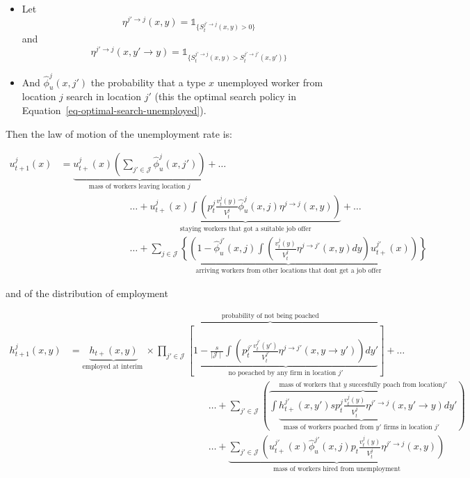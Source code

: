 \documentclass[
  letterpaper,
  DIV=11,
  numbers=noendperiod]{scrreprt}
\providecommand{\tightlist}{%
  \setlength{\itemsep}{0pt}\setlength{\parskip}{0pt}}\usepackage{longtable,booktabs,array}
\begin{document}
\begin{itemize}
\tightlist
\item
  Let
  \[\eta^{j' \to j}(x,y) = \mathbb{1}_{\{S_{t}^{j' \to j}(x,y)>0\}}\]
  and
  \[\eta^{j' \to j}(x,y'\to y) = \mathbb{1}_{\{S^{j' \to j}_{t}(x,y) > S^{j' \to j'}_{t}(x,y')\}}\]
\item
  And \(\hat{\phi}^j_u(x,j')\) the probability that a type \(x\)
  unemployed worker from location \(j\) search in location \(j'\) (this
  the optimal search policy in
  Equation~\ref{eq-optimal-search-unemployed}).
\end{itemize}

Then the law of motion of the unemployment rate is:

\begin{align}
u^{j}_{t+1}(x) &= \underbrace{u^j_{t+}(x)\left(\sum_{j'\in \mathcal{J}}\hat{\phi}^{j}_{u}(x,j')\right)}_{\text{mass of workers leaving location }j} +\ldots \nonumber \\
&\hspace{3cm} \ldots+ \underbrace{u_{t+}^j(x)\int\left(p^j_t\frac{v^j_t(y)}{V^j_t}\hat{\phi}_u^j(x,j)\eta^{j\to j}(x,y)\right)}_{\text{staying workers that got a suitable job offer}} +\ldots \nonumber \\
&\hspace{3cm} \ldots+ \underbrace{\sum_{j\in \mathcal{J}}\left\{\left(1 - \hat{\phi}^{j'}_{u}(x,j)\int\left(\frac{v^j_{t}(y)}{V^j_t}\eta^{j\to j'}(x,y)dy \right)u^{j'}_{t+}(x) \right) \right\}}_{\text{arriving workers from other locations that dont get a job offer}}
\end{align}

and of the distribution of employment

\begin{align}
h^{j}_{t+1}(x,y) &= \underbrace{h_{t+}(x,y)}_{\text{employed at interim }} \times \overbrace{\prod_{j'\in\mathcal{J}}\left[ \underbrace{1 - \frac{s}{\mid \mathcal{J} \mid}\int\left( p^{j'}_t\frac{v^{j'}_t(y')}{V^{j'}_t} \eta^{j\to j'}(x,y\to y')\right)dy'}_{\text{no poeached by any firm in location }j'} \right]}^{\text{probability of not being poached}}+\ldots\nonumber
\\
&\hspace{6cm} \ldots+\sum_{j'\in \mathcal{J}}\left(\overbrace{\int\underbrace{ h^{j'}_{t+}(x,y')sp^j_t\frac{v^{j}_t(y)}{V^{j}_t}\eta^{j'\to j}(x,y'\to y)}_{\text{mass of workers poached from } y' \text{ firms in location } j'}dy'}^{\text{mass of workers that } y \text{ succesfully poach from location} j'} \right) \nonumber \\
&\hspace{6cm}\ldots +  \underbrace{\sum_{j'\in \mathcal{J}}\left( u^{j'}_{t+}(x)\hat{\phi}_{u}^{j'}(x, j)p_t\frac{v^{j}_t(y)}{V^{j}_t}\eta^{j' \to j}(x,y) \right)}_{\text{mass of workers hired from unemployment}}
\end{align}
\end{document}
